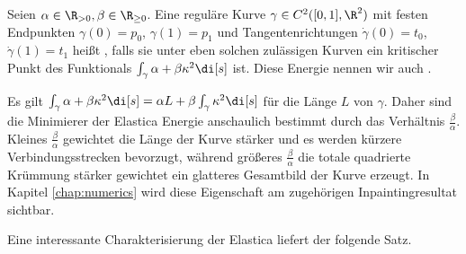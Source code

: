 \documentclass{mythesis}
\begin{document}
\begin{definition} \label{definition:elastica}
    Seien $\alpha \in \R_{>0}, \beta \in \R_{\ge 0}$.
    Eine reguläre Kurve $\gamma \in C^2([0,1], \R^2)$ mit festen Endpunkten $\gamma(0) = p_0$, $\gamma(1) = p_1$ und Tangentenrichtungen $\dot\gamma(0) = t_0$, $\dot\gamma(1) = t_1$ heißt , falls sie unter eben solchen zulässigen Kurven ein kritischer Punkt des Funktionals
    \begin{math}
	\int_\gamma \alpha + \beta \kappa^2 \di[s]
    \end{math}
    ist.
    Diese Energie nennen wir auch .
    \begin{note}
	Es gilt
	\begin{math}
	    \int_\gamma \alpha + \beta \kappa^2 \di[s] = \alpha L + \beta \int_\gamma \kappa^2 \di[s]
	\end{math}
	für die Länge $L$ von $\gamma$.
	Daher sind die Minimierer der Elastica Energie anschaulich bestimmt durch das Verhältnis $\frac{\beta}{\alpha}$.
       	Kleines $\frac{\beta}{\alpha}$ gewichtet die Länge der Kurve stärker und es werden kürzere Verbindungsstrecken bevorzugt, während größeres $\frac{\beta}{\alpha}$ die totale quadrierte Krümmung stärker gewichtet ein glatteres Gesamtbild der Kurve erzeugt.
	In Kapitel \ref{chap:numerics} wird diese Eigenschaft am zugehörigen Inpaintingresultat sichtbar.
    \end{note}
\end{definition}

Eine interessante Charakterisierung der Elastica liefert der folgende Satz.
\end{document}
